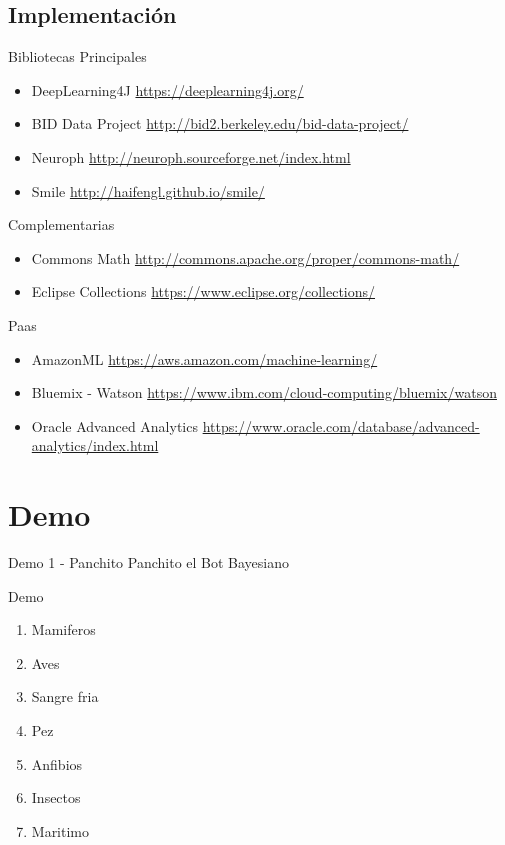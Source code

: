 \documentclass{beamer}
\begin{document}
\subsection{Implementación}
\begin{frame}{Bibliotecas}
    Principales
    \begin{itemize}
        \item DeepLearning4J \url{https://deeplearning4j.org/}
        \item BID Data Project \url{http://bid2.berkeley.edu/bid-data-project/}
        \item Neuroph \url{http://neuroph.sourceforge.net/index.html}
                \item Smile \url{http://haifengl.github.io/smile/}
    \end{itemize}

    Complementarias
    \begin{itemize}
        \item Commons Math \url{http://commons.apache.org/proper/commons-math/}
        \item Eclipse Collections \url{https://www.eclipse.org/collections/}
    \end{itemize}
\end{frame}

\begin{frame}{Paas}
    \begin{itemize}
        \item AmazonML \url{https://aws.amazon.com/machine-learning/}
        \item Bluemix - Watson \url{https://www.ibm.com/cloud-computing/bluemix/watson}
        \item Oracle Advanced Analytics \url{https://www.oracle.com/database/advanced-analytics/index.html}
    \end{itemize}
\end{frame}


\section{Demo}
\begin{frame}{Demo 1 - Panchito}
Panchito el Bot Bayesiano
\end{frame}


\begin{frame}{Demo}
    \begin{enumerate}
        \item Mamiferos
        \item Aves
        \item Sangre fria
        \item Pez
        \item Anfibios
        \item Insectos
        \item Maritimo
    \end{enumerate}
\end{frame}
\end{document}
